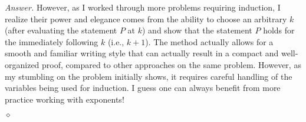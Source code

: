 \documentclass[12pt,oneside]{amsart}
\theoremstyle{remark}
\newenvironment{answer}{\noindent\emph{Answer.}}{\hfill$\diamond$\newline}
\begin{document}
\begin{answer}
However, as I worked through more problems requiring induction, I realize their power and elegance comes from the ability to choose an arbitrary $k$ (after evaluating the statement $P$ at $k$) and show that the statement $P$ holds for the immediately following $k$ (i.e., $k + 1$). The method actually allows for a smooth and familiar writing style that can actually result in a compact and well-organized proof, compared to other approaches on the same problem. However, as my stumbling on the problem initially shows, it requires careful handling of the variables being used for induction. I guess one can always benefit from more practice working with exponents!

\end{answer}
\end{document}
